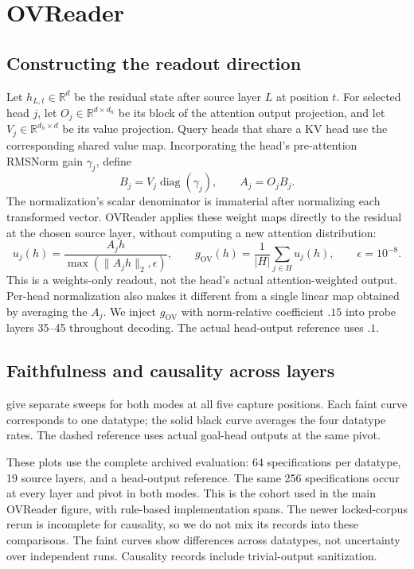 \clearpage
\section{OVReader}
\label{app:ovreader}
\subsection{Constructing the readout direction}
Let $h_{L,t}\in\mathbb{R}^{d}$ be the residual state after source layer $L$ at position $t$. For selected head $j$, let $O_j\in\mathbb{R}^{d\times d_h}$ be its block of the attention output projection, and let $V_j\in\mathbb{R}^{d_h\times d}$ be its value projection. Query heads that share a KV head use the corresponding shared value map. Incorporating the head's pre-attention RMSNorm gain $\gamma_j$, define
\begin{equation}
B_j=V_j\operatorname{diag}(\gamma_j),\qquad A_j=O_j B_j.
\end{equation}
The normalization's scalar denominator is immaterial after normalizing each transformed vector. OVReader applies these weight maps directly to the residual at the chosen source layer, without computing a new attention distribution:
\begin{equation}
u_j(h)=\frac{A_jh}{\max(\|A_jh\|_2,\epsilon)},\qquad
g_{\mathrm{OV}}(h)=\frac{1}{|H|}\sum_{j\in H}u_j(h),\qquad \epsilon=10^{-8}.
\end{equation}
This is a weights-only readout, not the head's actual attention-weighted output. Per-head normalization also makes it different from a single linear map obtained by averaging the $A_j$. We inject $g_{\mathrm{OV}}$ with norm-relative coefficient $.15$ into probe layers 35--45 throughout decoding. The actual head-output reference uses $.1$.

\subsection{Faithfulness and causality across layers}
 give separate sweeps for both modes at all five capture positions. Each faint curve corresponds to one datatype; the solid black curve averages the four datatype rates. The dashed reference uses actual goal-head outputs at the same pivot.

These plots use the complete archived evaluation: 64 specifications per datatype, 19 source layers, and a head-output reference. The same 256 specifications occur at every layer and pivot in both modes. This is the cohort used in the main OVReader figure, with rule-based implementation spans. The newer locked-corpus rerun is incomplete for causality, so we do not mix its records into these comparisons. The faint curves show differences across datatypes, not uncertainty over independent runs. Causality records include trivial-output sanitization.

